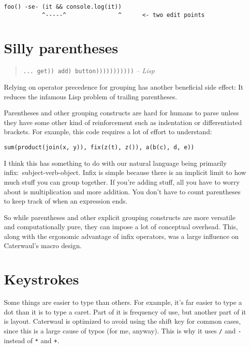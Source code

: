 \documentclass{report}
\begin{document}
\begin{verbatim}
foo() -se- (it && console.log(it))
           ^-----^               ^      <- two edit points
\end{verbatim}

\section{Silly parentheses}
\begin{quote}
{\tt ... get)) add) button)))))))))))}
\hfill \textit{-- Lisp}
\end{quote}

    Relying on operator precedence for grouping has another beneficial side effect: It reduces the infamous Lisp problem of trailing parentheses.

    Parentheses and other grouping constructs are hard for humans to parse unless they have some other kind of reinforcement such as indentation or differentiated brackets. For example, this
    code requires a lot of effort to understand:

\begin{verbatim}
sum(product(join(x, y)), fix(z(t), z()), a(b(c), d, e))
\end{verbatim}

    I think this has something to do with our natural language being primarily infix:~subject-verb-object. Infix is simple because there is an implicit limit to how much stuff you can group
    together. If you're adding stuff, all you have to worry about is multiplication and more addition. You don't have to count parentheses to keep track of when an expression ends.

    So while parentheses and other explicit grouping constructs are more versatile and computationally pure, they can impose a lot of conceptual overhead. This, along with the ergonomic
    advantage of infix operators, was a large influence on Caterwaul's macro design.

\section{Keystrokes}
    Some things are easier to type than others. For example, it's far easier to type a dot than it is to type a caret. Part of it is frequency of use, but another part of it is layout.
    Caterwaul is optimized to avoid using the shift key for common cases, since this is a large cause of typos (for me, anyway). This is why it uses \verb|/| and \verb|-| instead of \verb|*|
    and \verb|+|.
\end{document}
